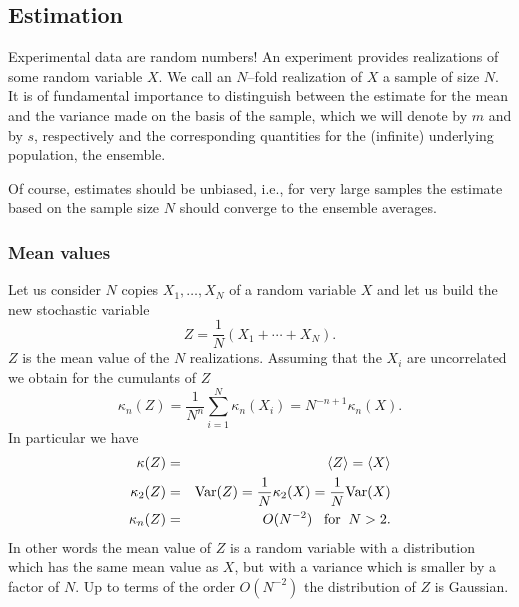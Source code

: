 \subsection{Estimation}
Experimental data are random numbers! An experiment provides
realizations of some random variable $X$. We call an $N$--fold
realization of $X$ a sample of size $N$. It is of fundamental
importance to distinguish between the estimate for the mean and the
variance made on the basis of the sample, which we will denote by $m$
and by $s$, respectively and the corresponding quantities for the
(infinite) underlying population, the ensemble.

Of course, estimates should be unbiased, i.e., for very large samples
the estimate based on the sample size $N$ should converge to the
ensemble averages.

\subsubsection{Mean values}
Let us consider $N$ copies $X_1, \ldots, X_N$  of a random variable
$X$ and let us build the new stochastic variable
\begin{equation*}
Z = \frac{1}{N}(X_1 + \cdots + X_N).
\end{equation*}
$Z$ is the mean value of the $N$ realizations. Assuming that the $X_i$
are uncorrelated we obtain for the cumulants of $Z$
\begin{equation*}
\kappa_n(Z) = \frac{1}{N^n} \sum_{i=1}^N \kappa_n(X_i) =
      N^{-n+1}  \kappa_n(X).
\end{equation*}
In particular we have
\begin{eqnarray*}
\kappa(Z) & = & \langle Z \rangle = \langle X \rangle \\
\kappa_2(Z) & = & {\rm Var}(Z) = \frac{1}{N} \kappa_2(X) = \frac{1}{N}
                  {\rm Var}(X) \\
\kappa_n(Z) & = & O(N^{-2}) \;\;\; {\rm for} \;\; N>2.
\end{eqnarray*}
In other words the mean value of $Z$ is a random variable with a
distribution which has the same mean value as $X$, but with a variance
which is smaller by a factor of $N$. Up to terms of the order
$O(N^{-2})$ the distribution of $Z$ is Gaussian.

